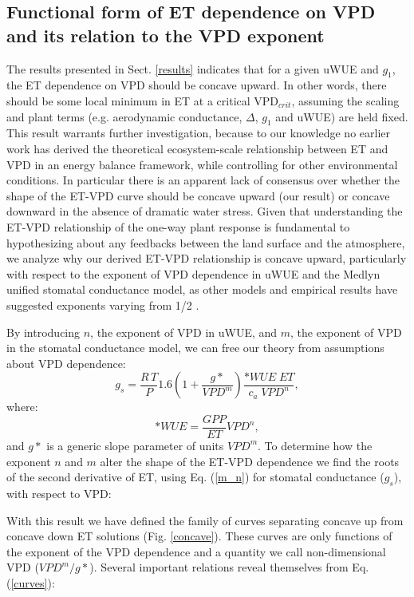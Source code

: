 \documentclass[draft]{agujournal2019}
\begin{document}
\subsection{Functional form of ET dependence on VPD and its relation
  to the VPD exponent}
\label{functional_form}

The results presented in Sect. \ref{results} indicates that for a
given uWUE and $g_1$, the ET dependence on VPD should be concave
upward. In other words, there should be some local minimum in ET at a
critical VPD$_{crit}$, assuming the scaling and plant terms
(e.g. aerodynamic conductance, $\Delta$, $g_1$ and uWUE) are held
fixed. This result warrants further investigation, because to our
knowledge no earlier work has derived the theoretical ecosystem-scale
relationship between ET and VPD in an energy balance framework, while
controlling for other environmental conditions. In particular there is
an apparent lack of consensus over whether the shape of the ET-VPD
curve should be concave upward (our result) or concave downward in the
absence of dramatic water stress. Given that understanding the ET-VPD
relationship of the one-way plant response is fundamental to
hypothesizing about any feedbacks between the land surface and the
atmosphere, we analyze why our derived ET-VPD relationship is concave
upward, particularly with respect to the exponent of VPD dependence in
uWUE and the Medlyn unified stomatal conductance model, as other
models and empirical results have suggested exponents varying from 1/2
\cite{Leuning_1990, Zhou_2015, Lin_2018}.

By introducing $n$, the exponent of VPD in uWUE, and $m$, the exponent
of VPD in the stomatal conductance model, we can free our theory from
assumptions about VPD dependence:
  \begin{equation}
    g_s = \frac{R \, T}{P} 1.6 \left(1 + \frac{g*}{VPD^m}\right) \frac{*WUE \; ET}{c_a \; VPD^n},
    \label{m_n}
  \end{equation}
where:
\[*WUE = \frac{GPP}{ET}VPD^n,\] and $g*$ is a generic slope parameter
of units $VPD^m$. To determine how the exponent $n$ and $m$ alter the
shape of the ET-VPD dependence we find the roots of the second
derivative of ET, using Eq. (\ref{m_n}) for stomatal conductance
($g_s$), with respect to VPD:



With this result we have defined the family of curves separating
concave up from concave down ET solutions (Fig. \ref{concave}). These
curves are only functions of the exponent of the VPD dependence and a
quantity we call non-dimensional VPD ($VPD^m/g*$). Several important
relations reveal themselves from Eq. (\ref{curves}):
\end{document}
